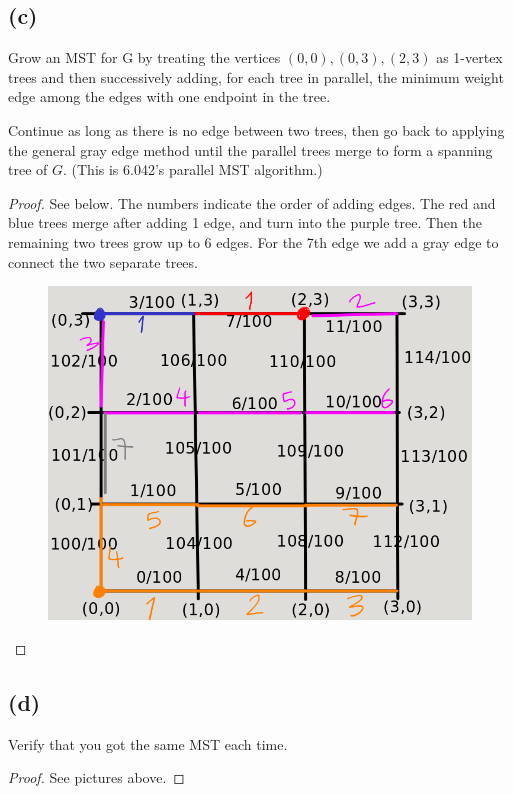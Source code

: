 \documentclass[14pt]{extarticle}
\begin{document}
\subsection{(c)}
Grow an MST for G by treating the vertices $(0,0),(0,3),(2,3)$ as 1-vertex trees and then successively adding, for each tree in parallel, the minimum weight edge among the edges with one endpoint in the tree.

Continue as long as there is no edge between two trees, then go back to applying the general gray edge method until the parallel trees merge to form a spanning tree of $G$. (This is 6.042’s parallel MST algorithm.)

\begin{proof}
See below. The numbers indicate the order of adding edges. The red and blue trees merge after adding 1 edge, and turn into the purple tree. Then the remaining two trees grow up to 6 edges. For the 7th edge we add a gray edge to connect the two separate trees.

\begin{figure}[ht!]
\centering
\includegraphics[scale=0.5]{mst-4.png}
\end{figure}
\end{proof}

\subsection{(d)}
Verify that you got the same MST each time.
\begin{proof}
See pictures above.
\end{proof}
\end{document}
